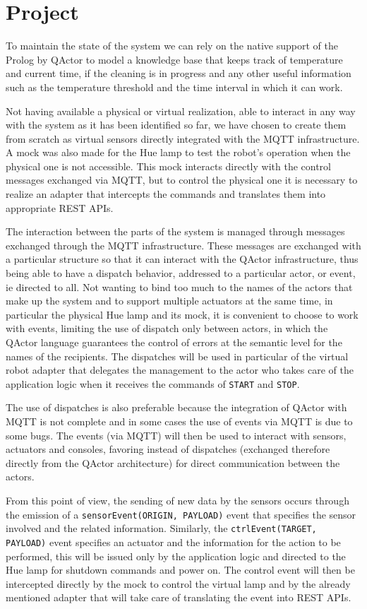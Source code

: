 \section{Project}
To maintain the state of the system we can rely on the native support of the Prolog by QActor to model a knowledge base that keeps track of temperature and current time, if the cleaning is in progress and any other useful information such as the temperature threshold and the time interval in which it can work.

Not having available a physical or virtual realization, able to interact in any way with the system as it has been identified so far, we have chosen to create them from scratch as virtual sensors directly integrated with the MQTT infrastructure. A mock was also made for the Hue lamp to test the robot's operation when the physical one is not accessible. This mock interacts directly with the control messages exchanged via MQTT, but to control the physical one it is necessary to realize an adapter that intercepts the commands and translates them into appropriate REST APIs.

The interaction between the parts of the system is managed through messages exchanged through the MQTT infrastructure. These messages are exchanged with a particular structure so that it can interact with the QActor infrastructure, thus being able to have a dispatch behavior, addressed to a particular actor, or event, ie directed to all. Not wanting to bind too much to the names of the actors that make up the system and to support multiple actuators at the same time, in particular the physical Hue lamp and its mock, it is convenient to choose to work with events, limiting the use of dispatch only between actors, in which the QActor language guarantees the control of errors at the semantic level for the names of the recipients. The dispatches will be used in particular of the virtual robot adapter that delegates the management to the actor who takes care of the application logic when it receives the commands of \texttt{START} and \texttt{STOP}.

The use of dispatches is also preferable because the integration of QActor with MQTT is not complete and in some cases the use of events via MQTT is due to some bugs. The events (via MQTT) will then be used to interact with sensors, actuators and consoles, favoring instead of dispatches (exchanged therefore directly from the QActor architecture) for direct communication between the actors.

From this point of view, the sending of new data by the sensors occurs through the emission of a \texttt{sensorEvent(ORIGIN, PAYLOAD)} event that specifies the sensor involved and the related information. Similarly, the \texttt{ctrlEvent(TARGET, PAYLOAD)} event specifies an actuator and the information for the action to be performed, this will be issued only by the application logic and directed to the Hue lamp for shutdown commands and power on. The control event will then be intercepted directly by the mock to control the virtual lamp and by the already mentioned adapter that will take care of translating the event into REST APIs.

